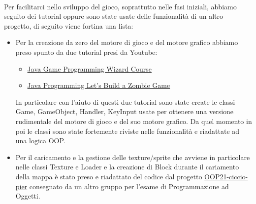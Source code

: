 \documentclass[a4paper,12pt]{report}
\begin{document}
\paragraph{}
\paragraph{}
\paragraph{}
\paragraph{}
\paragraph{}

Per facilitarci nello sviluppo del gioco, soprattutto nelle fasi iniziali, abbiamo seguito dei tutorial oppure sono state usate delle funzionalità di un altro progetto, di seguito viene fortina una lista:
\begin{itemize}
	\item Per la creazione da zero del motore di gioco e del motore grafico abbiamo preso spunto da due tutorial presi da Youtube: 
	 \begin{itemize}
	 	\item \href{https://www.youtube.com/playlist?list=PLWms45O3n--5vDnNd6aiu1CSWX3JlCU1n}{Java Game Programming Wizard Course}
	 	\item \href{https://www.youtube.com/playlist?list=PLWms45O3n--5vv69_AlMw23O1Z31CaW1F}{Java Programming Let's Build a Zombie Game}
	 \end{itemize}
	 In particolare con l'aiuto di questi due tutorial sono state create le classi Game, GameObject, Handler, KeyInput usate per ottenere una versione rudimentale del motore di gioco e del suo motore grafico.
	 Da quel momento in poi le classi sono state fortemente riviste nelle funzionalità e riadattate ad una logica OOP.
	 
	 \item Per il caricamento e la gestione delle texture/sprite che avviene in particolare nelle classi Texture e Loader e la creazione di Block durante il cariamento della mappa è stato preso e riadattato del codice dal progetto 
	 \href{https://github.com/Valdi1111/OOP21-ciccio-pier}{OOP21-ciccio-pier} consegnato da un altro gruppo per l'esame di Programmazione ad Oggetti.
	 
\end{itemize}
\end{document}
